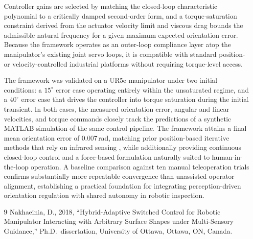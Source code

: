 \documentclass[a4,10pt]{article}
\begin{document}
Controller gains are selected by matching the closed-loop characteristic polynomial to a critically damped second-order form, and a torque-saturation constraint derived from the actuator velocity limit and viscous drag bounds the admissible natural frequency for a given maximum expected orientation error. Because the framework operates as an outer-loop compliance layer atop the manipulator's existing joint servo loops, it is compatible with standard position- or velocity-controlled industrial platforms without requiring torque-level access.

The framework was validated on a UR5e manipulator under two initial conditions: a $15^\circ$ error case operating entirely within the unsaturated regime, and a $40^\circ$ error case that drives the controller into torque saturation during the initial transient. In both cases, the measured orientation error, angular and linear velocities, and torque commands closely track the predictions of a synthetic MATLAB simulation of the same control pipeline. The framework attains a final mean orientation error of 0.007\,rad, matching prior position-based iterative methods that rely on infrared sensing \cite{Nakhaeinia}, while additionally providing continuous closed-loop control and a force-based formulation naturally suited to human-in-the-loop operation. A baseline comparison against ten manual teleoperation trials confirms substantially more repeatable convergence than unassisted operator alignment, establishing a practical foundation for integrating perception-driven orientation regulation with shared autonomy in robotic inspection.

\begin{thebibliography}{9}
 Nakhaeinia, D., 2018, ``Hybrid-Adaptive Switched Control for Robotic Manipulator Interacting with Arbitrary Surface Shapes under Multi-Sensory Guidance,'' Ph.D.\ dissertation, University of Ottawa, Ottawa, ON, Canada.
\end{thebibliography}
\end{document}
